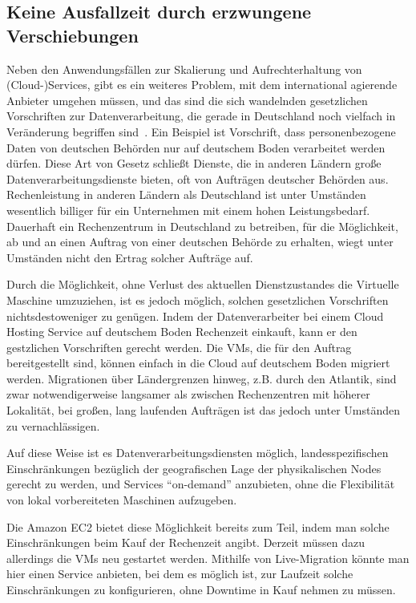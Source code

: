 \subsection{Keine Ausfallzeit durch erzwungene Verschiebungen}
\label{sec:keine-ausfallzeit}
Neben den Anwendungsfällen zur Skalierung und Aufrechterhaltung von
(Cloud-)Services, gibt es ein weiteres Problem, mit dem international
agierende Anbieter umgehen müssen, und das sind die sich wandelnden
gesetzlichen Vorschriften zur Datenverarbeitung, die gerade in
Deutschland noch vielfach in Veränderung begriffen
sind~\cite{bdsg-2009}. Ein Beispiel ist Vorschrift, dass
personenbezogene Daten von deutschen Behörden nur auf deutschem Boden
verarbeitet werden dürfen. Diese Art von Gesetz schließt Dienste, die
in anderen Ländern große Datenverarbeitungsdienste bieten, oft von
Aufträgen deutscher Behörden aus. Rechenleistung in anderen Ländern
als Deutschland ist unter Umständen wesentlich billiger für ein
Unternehmen mit einem hohen Leistungsbedarf. Dauerhaft ein
Rechenzentrum in Deutschland zu betreiben, für die Möglichkeit, ab und
an einen Auftrag von einer deutschen Behörde zu erhalten, wiegt unter
Umständen nicht den Ertrag solcher Aufträge auf.

Durch die Möglichkeit, ohne Verlust des aktuellen Dienstzustandes die
Virtuelle Maschine umzuziehen, ist es jedoch möglich, solchen
gesetzlichen Vorschriften nichtsdestoweniger zu genügen. Indem der
Datenverarbeiter bei einem Cloud Hosting Service auf deutschem Boden
Rechenzeit einkauft, kann er den gestzlichen Vorschriften gerecht
werden. Die VMs, die für den Auftrag bereitgestellt sind, können
einfach in die Cloud auf deutschem Boden migriert werden. Migrationen
über Ländergrenzen hinweg, z.B. durch den Atlantik, sind zwar
notwendigerweise langsamer als zwischen Rechenzentren mit höherer
Lokalität, bei großen, lang laufenden Aufträgen ist das jedoch unter
Umständen zu vernachlässigen.

Auf diese Weise ist es Datenverarbeitungsdiensten möglich,
landesspezifischen Einschränkungen bezüglich der geografischen Lage
der physikalischen Nodes gerecht zu werden, und Services "`on-demand"'
anzubieten, ohne die Flexibilität von lokal vorbereiteten Maschinen
aufzugeben.

Die Amazon EC2 bietet diese Möglichkeit bereits zum Teil, indem man
solche Einschränkungen beim Kauf der Rechenzeit angibt. Derzeit müssen
dazu allerdings die VMs neu gestartet werden. Mithilfe von
Live-Migration könnte man hier einen Service anbieten, bei dem es
möglich ist, zur Laufzeit solche Einschränkungen zu konfigurieren,
ohne Downtime in Kauf nehmen zu müssen.

